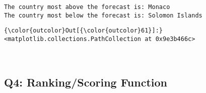 \documentclass[11pt]{article}
\begin{document}
    \begin{Verbatim}[commandchars=\\\{\}]
The country most above the forecast is: Monaco
The country most below the forecast is: Solomon Islands

    \end{Verbatim}

            \begin{Verbatim}[commandchars=\\\{\}]
{\color{outcolor}Out[{\color{outcolor}61}]:} <matplotlib.collections.PathCollection at 0x9e3b466c>
\end{Verbatim}
        
    \begin{center}
    \end{center}
    { \hspace*{\fill} \\}
    
    \subsection{Q4: Ranking/Scoring
Function}\label{q4-rankingscoring-function}
\end{document}
